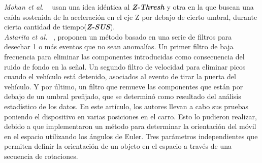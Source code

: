 		\emph{Mohan et al.} ~ usan una idea idéntica al \emph{\textbf{Z-Thresh}} y otra en la que buscan
		una caída sostenida de la aceleración en el eje Z por debajo de cierto umbral, durante cierta cantidad de tiempo(\emph{\textbf{Z-SUS}}).\\

		\emph{Astarita et al.} ~, proponen un método basado en una serie de filtros para desechar 1 o más eventos que
		no sean anomalías. Un primer filtro de baja frecuencia para eliminar las componentes introducidas como consecuencia del ruido de fondo en la señal.
		Un segundo filtro de velocidad para eliminar picos cuando el vehículo está detenido, asociados al evento de tirar la puerta del vehículo. Y por 
		último, un filtro que remueve las componentes que están por debajo de un umbral prefijado, que se determinó como resultado del análisis estadístico
		de los datos. En este artículo, los autores llevan a cabo sus pruebas poniendo el dispositivo en varias posiciones en el carro. Esto lo pudieron
		realizar, debido a que implementaron un método para determinar la orientación del móvil en el espacio utilizando los ángulos de Euler. Tres 
		parámetros independientes que permiten definir la orientación de un objeto en el espacio a través de una secuencia de rotaciones.



